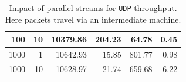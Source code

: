 \documentclass[12pt,a4paper]{report}
\begin{document}
\begin{table}[H]
\begin{tabular}{|r|r|r|r|r|r|}
100                                                                                             & 10                                                                                                                      & 10379.86                                                                                                                                   & 204.23                                                                                                                               & 64.78                                                                                                 & 0.45                                                                                                                               \\ \hline
1000                                                                                            & 1                                                                                                                       & 10642.93                                                                                                                                   & 15.85                                                                                                                                & 801.77                                                                                                & 0.98                                                                                                                               \\ \hline
1000                                                                                            & 10                                                                                                                      & 10628.97                                                                                                                                   & 21.74                                                                                                                                & 659.68                                                                                                & 6.22                                                                                                                               \\ \hline
\end{tabular}
    \centering
    \caption[Impact of parallel streams for \texttt{UDP} throughput]{Impact of parallel streams for \texttt{UDP} throughput. Here packets travel via an intermediate machine.}
    \label{fig:UDP_throughput_via_B_using_parallel_streams}
\end{table}
\end{document}
